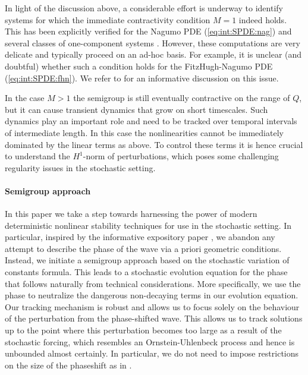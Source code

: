 \documentclass[10pt]{articleHJ}
\newcommand{\sref}[1]{(\ref{#1})}                       %
\numberwithin{equation}{section}
\begin{document}
In light of the discussion above, a considerable effort is underway
to identify systems for which the immediate contractivity condition $M=1$ indeed holds.
This has been explicitly verified
for the Nagumo PDE
\sref{eq:int:SPDE:nag} and several classes of one-component systems
\cite{Stannat,stannat2014stability, LangStannat2016l2}. However,
these computations are very delicate and typically proceed on an ad-hoc basis.
For example, it is unclear (and doubtful) whether such a condition holds
for the FitzHugh-Nagumo PDE \sref{eq:int:SPDE:fhn}. We refer
to \cite[{\S}1]{veraar2011note}
for an informative discussion on this issue.

In the case $M > 1$ the semigroup is still eventually contractive on the range of $Q$,
but it can cause transient dynamics that grow on short timescales.
Such dynamics play an important role and need to be tracked over temporal intervals
of intermediate length. In this case the nonlinearities cannot be immediately
dominated by the linear terms
as above. To control these terms it is hence crucial to understand
the $H^1$-norm of perturbations, which poses some challenging regularity issues
in the stochastic setting.




\paragraph{Semigroup approach}

In this paper we take a step towards harnessing the power
of modern deterministic nonlinear stability techniques
for use in the stochastic setting.
In particular, inspired by the informative
expository paper \cite{Zumbrun2009}, we abandon
any attempt to describe the phase of the wave via
a priori geometric conditions. Instead,
we initiate a semigroup approach based on the
stochastic variation of constants formula. This leads to
a stochastic evolution equation for the phase
that follows naturally from technical considerations.
More specifically, we use the phase to neutralize
the dangerous non-decaying terms in our evolution equation.
Our tracking mechanism is robust and allows us to focus solely
on the behaviour of the perturbation from the phase-shifted wave.
This allows us to track solutions up to the point where this
perturbation becomes too large as a result of the stochastic forcing,
which resembles an Ornstein-Uhlenbeck process and hence is unbounded
almost certainly.
In particular, we do not need to impose restrictions
on the size of the phaseshift
as in \cite{Lang,kruger2017multiscale}.
\end{document}
